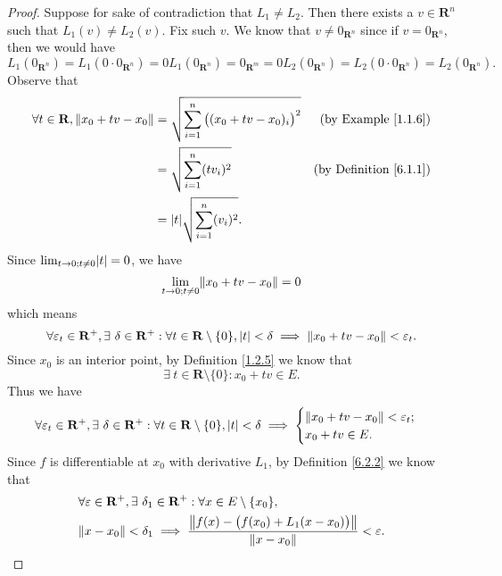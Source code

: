 \begin{proof}
    Suppose for sake of contradiction that \(L_1 \neq L_2\).
    Then there exists a \(v \in \mathbf{R}^n\) such that \(L_1(v) \neq L_2(v)\).
    Fix such \(v\).
    We know that \(v \neq 0_{\mathbf{R}^n}\) since if \(v = 0_{\mathbf{R}^n}\), then we would have
    \[
        L_1(0_{\mathbf{R}^n}) = L_1(0 \cdot 0_{\mathbf{R}^n}) = 0 L_1(0_{\mathbf{R}^n}) = 0_{\mathbf{R}^m} = 0 L_2(0_{\mathbf{R}^n}) = L_2(0 \cdot 0_{\mathbf{R}^n}) = L_2(0_{\mathbf{R}^n}).
    \]
    Observe that
    \begin{align*}
        \forall t \in \mathbf{R}, \norm*{x_0 + tv - x_0} & = \sqrt{\sum_{i = 1}^n \big((x_0 + tv - x_0)_i\big)^2} & \text{(by Example \ref{1.1.6})}    \\
                                                         & = \sqrt{\sum_{i = 1}^n (t v_i)^2}                      & \text{(by Definition \ref{6.1.1})} \\
                                                         & = \abs*{t} \sqrt{\sum_{i = 1}^n (v_i)^2}.
    \end{align*}
    Since \(\lim_{t \to 0 ; t \neq 0} \abs*{t} = 0\), we have
    \[
        \lim_{t \to 0 ; t \neq 0} \norm*{x_0 + tv - x_0} = 0
    \]
    which means
    \[
        \forall \varepsilon_t \in \mathbf{R}^+, \exists\ \delta \in \mathbf{R}^+ : \forall t \in \mathbf{R} \setminus \{0\}, \abs*{t} < \delta \implies \norm*{x_0 + tv - x_0} < \varepsilon_t.
    \]
    Since \(x_0\) is an interior point, by Definition \ref{1.2.5} we know that
    \[
        \exists\ t \in \mathbf{R} \setminus \{0\} : x_0 + tv \in E.
    \]
    Thus we have
    \[
        \forall \varepsilon_t \in \mathbf{R}^+, \exists\ \delta \in \mathbf{R}^+ : \forall t \in \mathbf{R} \setminus \{0\}, \abs*{t} < \delta \implies \begin{cases}
            \norm*{x_0 + tv - x_0} < \varepsilon_t; \\
            x_0 + tv \in E.
        \end{cases}
    \]
    Since \(f\) is differentiable at \(x_0\) with derivative \(L_1\), by Definition \ref{6.2.2} we know that
    \begin{align*}
         & \forall \varepsilon \in \mathbf{R}^+, \exists\ \delta_1 \in \mathbf{R}^+ : \forall x \in E \setminus \{x_0\},             \\
         & \norm*{x - x_0} < \delta_1 \implies \frac{\norm*{f(x) - \big(f(x_0) + L_1(x - x_0)\big)}}{\norm*{x - x_0}} < \varepsilon.
    \end{align*}

\end{proof}
